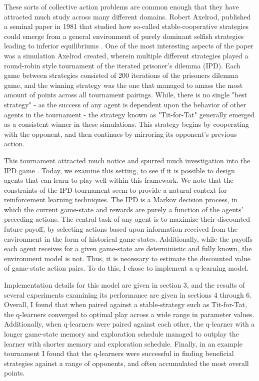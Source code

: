 \documentclass[12pt]{amsart}
\newcommand{\0}{\mat{0}}
\newcommand{\1}{\mathds{1}}
\begin{document}
These sorts of collective action problems are common enough that they have attracted much study across many different domains.  Robert Axelrod, published a seminal paper in 1981 that studied how so-called stable-cooperative strategies could emerge from a general environment of purely dominant selfish strategies leading to inferior equilibriums  \cite{axelrod1987evolution}.   One of the most interesting aspects of the paper was a simulation Axelrod created, wherein multiple different strategies played a round-robin style tournament of the iterated prisoner's dilemma (IPD).  Each game between strategies consisted of 200 iterations of the prisoners dilemma game, and the winning strategy was the one that managed to amass the most amount of points across all tournament pairings.  While, there is no single "best strategy" - as the success of any agent is dependent upon the behavior of other agents in the tournament - the strategy known as "Tit-for-Tat" generally emerged as a consistent winner in these simulations.  This strategy begins by cooperating with the opponent, and then continues by mirroring its opponent's previous action.

This tournament attracted much notice and spurred much investigation into the IPD game  \cite{fogel1993evolving}.  Today, we examine this setting, to see if it is possible to design agents that can learn to play well within this framework.  We note that the constraints of the IPD tournament seem to provide a natural context for reinforcement learning techniques.  The IPD is a Markov decision process, in which the current game-state and rewards are purely a function of the agents' preceding actions. The central task of any agent is to maximize their discounted future payoff, by selecting actions based upon information received from the environment in the form of historical game-states.  Additionally, while the payoffs each agent receives for a given game-state are deterministic and fully known, the environment model is not.  Thus, it is necessary to estimate the discounted value of game-state action pairs.  To do this, I chose to implement a q-learning model\cite{sandholm1996multiagent}.

Implementation details for this model are given in section 3, and the results of several experiments examining its performance are given in sections 4 through 6.  Overall, I found that when paired against a stable-strategy such as Tit-for-Tat, the q-learners converged to optimal play across a wide range in parameter values.  Additionally, when q-learners were paired against each other, the q-learner with a longer game-state memory and exploration schedule managed to outplay the learner with shorter memory and exploration schedule.  Finally, in an example tournament I found that the q-learners were successful in finding beneficial strategies against a range of opponents, and often accumulated the most overall points.
\end{document}
